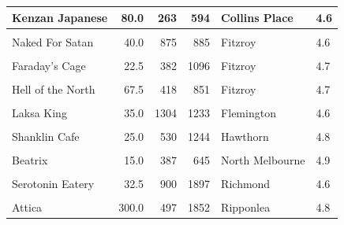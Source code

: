 \documentclass[11pt,a4paper,]{article}
\begin{document}
\begin{table}[!h]
\begin{tabular}[t]{l|r|r|r|l|l}
\hline
Kenzan Japanese & 80.0 & 263 & 594 & Collins Place & 4.6\\
\hline
\cellcolor{gray!6}{Addict Food \& Coffee} & \cellcolor{gray!6}{20.0} & \cellcolor{gray!6}{570} & \cellcolor{gray!6}{1350} & \cellcolor{gray!6}{Fitzroy} & \cellcolor{gray!6}{4.6}\\
\hline
Naked For Satan & 40.0 & 875 & 885 & Fitzroy & 4.6\\
\hline
\cellcolor{gray!6}{Lune Croissanterie} & \cellcolor{gray!6}{12.5} & \cellcolor{gray!6}{754} & \cellcolor{gray!6}{1831} & \cellcolor{gray!6}{Fitzroy} & \cellcolor{gray!6}{4.9}\\
\hline
Faraday's Cage & 22.5 & 382 & 1096 & Fitzroy & 4.7\\
\hline
\cellcolor{gray!6}{Cutler \& Co} & \cellcolor{gray!6}{100.0} & \cellcolor{gray!6}{570} & \cellcolor{gray!6}{988} & \cellcolor{gray!6}{Fitzroy} & \cellcolor{gray!6}{4.7}\\
\hline
Hell of the North & 67.5 & 418 & 851 & Fitzroy & 4.7\\
\hline
\cellcolor{gray!6}{Hinoki Japanese Pantry} & \cellcolor{gray!6}{27.5} & \cellcolor{gray!6}{274} & \cellcolor{gray!6}{383} & \cellcolor{gray!6}{Fitzroy} & \cellcolor{gray!6}{4.9}\\
\hline
Laksa King & 35.0 & 1304 & 1233 & Flemington & 4.6\\
\hline
\cellcolor{gray!6}{Shira Nui} & \cellcolor{gray!6}{75.0} & \cellcolor{gray!6}{424} & \cellcolor{gray!6}{754} & \cellcolor{gray!6}{Glen Waverley} & \cellcolor{gray!6}{4.8}\\
\hline
Shanklin Cafe & 25.0 & 530 & 1244 & Hawthorn & 4.8\\
\hline
\cellcolor{gray!6}{The Proud Peacock} & \cellcolor{gray!6}{22.5} & \cellcolor{gray!6}{631} & \cellcolor{gray!6}{481} & \cellcolor{gray!6}{Mount Waverley} & \cellcolor{gray!6}{4.8}\\
\hline
Beatrix & 15.0 & 387 & 645 & North Melbourne & 4.9\\
\hline
\cellcolor{gray!6}{Dexter} & \cellcolor{gray!6}{55.0} & \cellcolor{gray!6}{685} & \cellcolor{gray!6}{1498} & \cellcolor{gray!6}{Preston} & \cellcolor{gray!6}{4.9}\\
\hline
Serotonin Eatery & 32.5 & 900 & 1897 & Richmond & 4.6\\
\hline
\cellcolor{gray!6}{Minamishima} & \cellcolor{gray!6}{225.0} & \cellcolor{gray!6}{297} & \cellcolor{gray!6}{1435} & \cellcolor{gray!6}{Richmond} & \cellcolor{gray!6}{4.9}\\
\hline
Attica & 300.0 & 497 & 1852 & Ripponlea & 4.8\\

\end{tabular}
\end{table}
\end{document}
